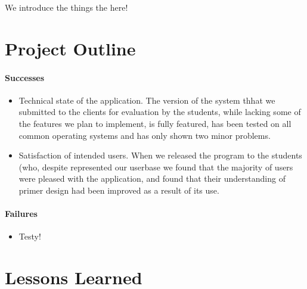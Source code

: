 
We introduce the things the here!

\section{Project Outline}
\paragraph{Successes}
\begin{itemize}
\item Technical state of the application. The version of the system thhat
  we submitted to the clients for evaluation by the students, while lacking
  some of the features we plan to implement, is fully featured, has been
  tested on all common operating systems and has only shown two minor problems.
\item Satisfaction of intended users. When we released the program to the
  students (who, despite %
  represented our userbase %
  we found that the majority of users were pleased with the application, and
  found that their understanding of primer design had been improved as a result
  of its use.
\end{itemize}

\paragraph{Failures}
\begin{itemize}
\item Testy!
\end{itemize}

\section{Lessons Learned}
